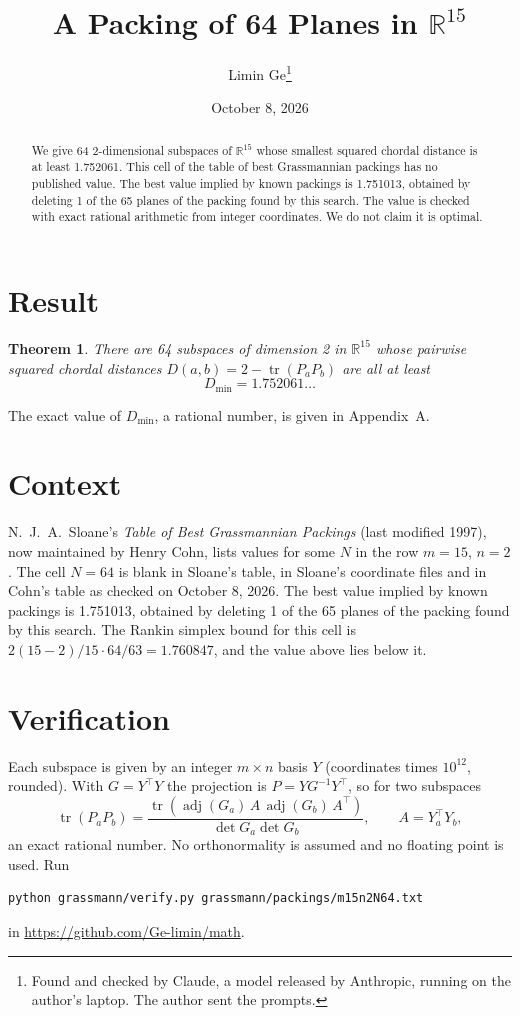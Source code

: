 \documentclass[11pt,a4paper]{article}
\title{A Packing of 64 Planes in $\mathbb{R}^{15}$}
\author{Limin Ge\thanks{Found and checked by Claude, a model released by Anthropic, running on the author's laptop. The author sent the prompts.}}
\date{October 8, 2026}
\newtheorem*{theorem}{Theorem}
\begin{document}
\maketitle
\begin{abstract}
We give 64 2-dimensional subspaces of $\mathbb{R}^{15}$ whose smallest squared chordal distance is at least 1.752061. This cell of the table of best Grassmannian packings has no published value. The best value implied by known packings is 1.751013, obtained by deleting 1 of the 65 planes of the packing found by this search. The value is checked with exact rational arithmetic from integer coordinates. We do not claim it is optimal.
\end{abstract}

\section{Result}
\begin{theorem}
There are 64 subspaces of dimension 2 in $\mathbb{R}^{15}$ whose pairwise squared chordal distances $D(a,b) = 2 - \operatorname{tr}(P_aP_b)$ are all at least
\[ D_{\min} = 1.752061\ldots \]
\end{theorem}
The exact value of $D_{\min}$, a rational number, is given in Appendix~A.


\section{Context}
N.~J.~A.~Sloane's \emph{Table of Best Grassmannian Packings} (last modified 1997), now maintained by Henry Cohn, lists values for some $N$ in the row $m=15$, $n=2$. The cell $N=64$ is blank in Sloane's table, in Sloane's coordinate files and in Cohn's table as checked on October 8, 2026. The best value implied by known packings is 1.751013, obtained by deleting 1 of the 65 planes of the packing found by this search. The Rankin simplex bound for this cell is $2(15-2)/15\cdot 64/63 = 1.760847$, and the value above lies below it.


\section{Verification}
Each subspace is given by an integer $m\times n$ basis $Y$ (coordinates times $10^{12}$, rounded). With $G=Y^\top Y$ the projection is $P=YG^{-1}Y^\top$, so for two subspaces
\[ \operatorname{tr}(P_aP_b)=\frac{\operatorname{tr}(\operatorname{adj}(G_a)\,A\,\operatorname{adj}(G_b)\,A^\top)}{\det G_a\det G_b},\qquad A=Y_a^\top Y_b, \]
an exact rational number. No orthonormality is assumed and no floating point is used. Run
\begin{verbatim}
python grassmann/verify.py grassmann/packings/m15n2N64.txt
\end{verbatim}
in \url{https://github.com/Ge-limin/math}.
\end{document}
